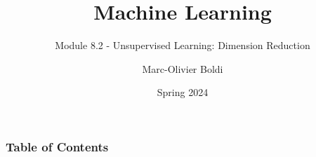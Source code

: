
\title{Machine Learning}
\subtitle{Module 8.2 - Unsupervised Learning: Dimension Reduction}
\author[MOB]{Marc-Olivier Boldi}
\date[Spring 2024]{Spring 2024}

\begin{frame}
  \titlepage
\end{frame}
\begin{frame}
\frametitle{Table of Contents}
	\tableofcontents
\end{frame}
